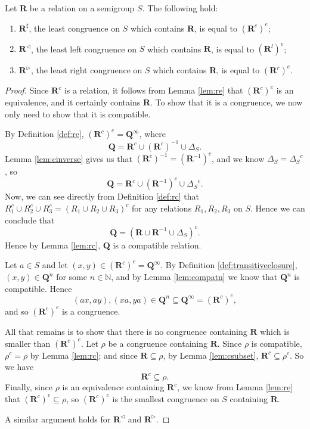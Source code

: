 \begin{theorem}
  \label{thm:rsharp}
  Let $\mathbf{R}$ be a relation on a semigroup $S$.
  The following hold:
  \begin{enumerate}[\rm(i)]
  \item $\mathbf{R}^\sharp$, the least congruence on $S$ which contains
    $\mathbf{R}$, is equal to $(\mathbf{R}^c)^e$;
  \item $\mathbf{R}^\triangleleft$, the least left congruence on $S$ which
    contains $\mathbf{R}$, is equal to $(\mathbf{R}^l)^e$;
  \item $\mathbf{R}^\triangleright$, the least right congruence on $S$ which
    contains $\mathbf{R}$, is equal to $(\mathbf{R}^r)^e$.
  \end{enumerate}
  \begin{proof}
    Since $\mathbf{R}^c$ is a relation, it follows from Lemma \ref{lem:re} that
    $(\mathbf{R}^c)^e$ is an equivalence, and it certainly contains
    $\mathbf{R}$.  To show that it is a congruence, we now only need to show
    that it is compatible.

    By Definition \ref{def:re}, $(\mathbf{R}^c)^e = \mathbf{Q}^\infty$, where
    $$\mathbf{Q} =
    \mathbf{R}^c \cup
    (\mathbf{R}^c)^{-1} \cup
    \Delta_S.$$
    Lemma \ref{lem:cinverse} gives us that
    $(\mathbf{R}^c)^{-1} = (\mathbf{R}^{-1})^c$, and
    we know
    $\Delta_S = {\Delta_S}^c$, so
    $$\mathbf{Q} =
    \mathbf{R}^c \cup
    (\mathbf{R}^{-1})^c \cup
    {\Delta_S}^c.$$
    Now, we can see directly from Definition \ref{def:rc} that
    $R_1^c \cup R_2^c \cup R_3^c = (R_1 \cup R_2 \cup R_3)^c$ for any relations
    $R_1, R_2, R_3$ on $S$.  Hence we can conclude that
    $$\mathbf{Q} =
    (\mathbf{R} \cup \mathbf{R}^{-1} \cup \Delta_S)^c.$$
    Hence by Lemma \ref{lem:rc}, $\mathbf{Q}$ is a compatible relation.

    Let $a \in S$ and let $(x,y) \in (\mathbf{R}^c)^e = \mathbf{Q}^\infty$.
    By Definition \ref{def:transitiveclosure}, $(x,y) \in \mathbf{Q}^n$ for some
    $n \in \mathbb{N}$, and by Lemma \ref{lem:compatn} we know that
    $\mathbf{Q}^n$ is compatible.  Hence
    $$(ax,ay), (xa, ya) \in \mathbf{Q}^n \subseteq \mathbf{Q}^\infty =
    (\mathbf{R}^c)^e,$$ and so $(\mathbf{R}^c)^e$ is a congruence.

    All that remains is to show that there is no congruence containing
    $\mathbf{R}$ which is smaller than $(\mathbf{R}^c)^e$.
    Let $\rho$ be a congruence containing $\mathbf{R}$.  Since $\rho$ is
    compatible, $\rho^c = \rho$ by Lemma \ref{lem:rc}; and since $\mathbf{R}
    \subseteq \rho$, by Lemma \ref{lem:csubset}, $\mathbf{R}^c \subseteq
    \rho^c$.  So we have
    $$\mathbf{R}^c \subseteq \rho.$$
    Finally, since $\rho$ is an equivalence containing $\mathbf{R}^c$, we know
    from Lemma \ref{lem:re} that $(\mathbf{R}^c)^e \subseteq \rho$, so
    $(\mathbf{R}^c)^e$ is the smallest congruence on $S$ containing
    $\mathbf{R}$. \cite[\S1.5]{howie}

    A similar argument holds for $\mathbf{R}^\triangleleft$ and
    $\mathbf{R}^\triangleright$.
  \end{proof}
\end{theorem}

